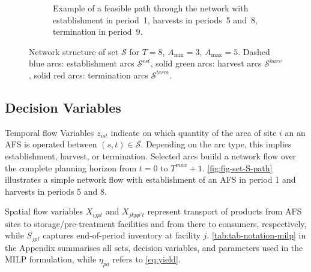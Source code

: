 \documentclass[APA,TimesLARGE]{WileyNJDv5} %
\newcommand{\Sc}{\mathcal{S}}
\begin{document}
\begin{figure}[htbp]
\begin{subfigure}[b]{\linewidth}
    \caption{Example of a feasible path through the network with establishment in period~1, harvests in periods~5 and~8, termination in period~9.}
    \label{fig:fig-set-S-path}
  \end{subfigure}

  \caption{Network structure of set $\mathcal{S}$ for $T=8$, $A_{\min}=3$, $A_{\max}=5$. Dashed blue arcs: establishment arcs $\Sc^{{est}}$, solid green arcs: harvest arcs $\Sc^{{harv}}$, solid red arcs: termination arcs $\Sc^{{term}}$.}
  \label{fig:fig-set-S}
\end{figure}

\subsection{Decision Variables}\label{decision-variables}

Temporal flow Variables \(z_{ist}\) indicate on which quantity of the area of site \(i\) an an AFS is operated between \((s,t) \in \Sc\). Depending on the arc type, this implies establishment, harvest, or termination. Selected arcs buiild a network flow over the complete planning horizon from \(t=0\) to \(T^{max}+1\). \autoref{fig:fig-set-S-path} illustrates a simple network flow with establishment of an AFS in period 1 and harvests in periods 5 and 8.

Spatial flow variables \(X_{ijpt}\) and \(X_{jkpp't}\) represent transport of products from AFS sites to storage/pre-treatment facilities and from there to consumers, respectively, while \(S_{jpt}\) captures end-of-period inventory at facility \(j\). \autoref{tab:tab-notation-milp} in the Appendix summarises all sets, decision variables, and parameters used in the MILP formulation, while \(\eta_{pa}\) refers to \eqref{eq:yield}.
\end{document}
